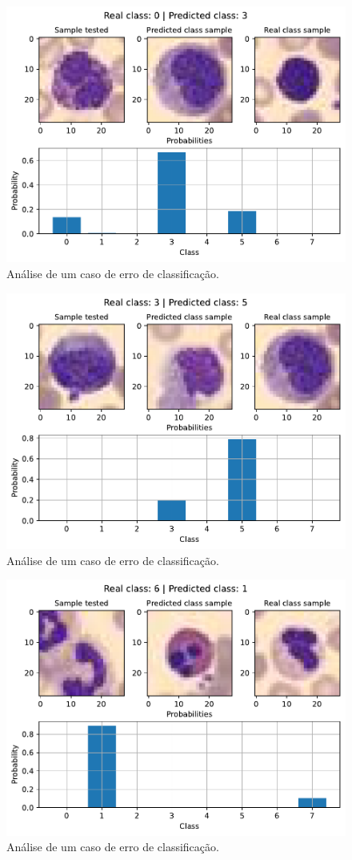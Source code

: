 \begin{figure}[H]
\centering
\includegraphics[width=0.75\linewidth]{../../plot/mlp/error_analyser_36}
\caption{Análise de um caso de erro de classificação.}
\label{fig:error_analyser_36}
\end{figure}

\begin{figure}[H]
\centering
\includegraphics[width=0.75\linewidth]{../../plot/mlp/error_analyser_0}
\caption{Análise de um caso de erro de classificação.}
\label{fig:error_analyser_0}
\end{figure}

\begin{figure}[H]
\centering
\includegraphics[width=0.75\linewidth]{../../plot/mlp/error_analyser_25}
\caption{Análise de um caso de erro de classificação.}
\label{fig:error_analyser_25}
\end{figure}

